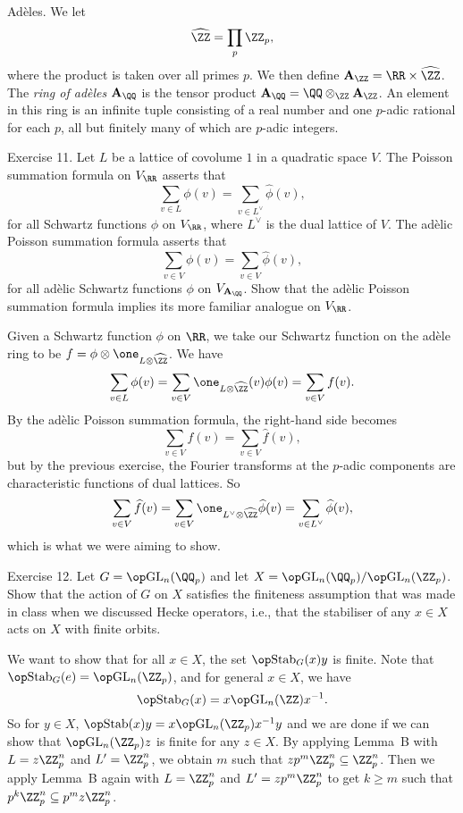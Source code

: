 \boldlabel Ad\`eles. We let
$$\hat\ZZ = \prod_p \ZZ_p,$$
\vskip-5pt\noindent
where the product is taken over all primes $p$.
We then define $\AA_\ZZ = \RR\times \hat\ZZ$. The {\it ring of ad\`eles} $\AA_\QQ$ is the tensor product
$\AA_\QQ = \QQ\otimes_\ZZ \AA_\ZZ$. An element in this ring is an infinite tuple consisting
of a real number and one $p$-adic
rational for each $p$, all but finitely many of which are $p$-adic integers.

\nineproclaim Exercise 11. Let $L$ be a lattice of covolume $1$ in a quadratic space $V$. The Poisson
summation formula on $V_\RR$ asserts that
$$\sum_{v\in L} \phi(v) = \sum_{v\in L^\vee} \hat\phi(v),$$
for all Schwartz functions $\phi$ on $V_\RR$, where $L^\vee$ is the dual lattice of $V$. The ad\`elic
Poisson summation formula asserts that
$$\sum_{v\in V} \phi(v) = \sum_{v\in V} \hat\phi(v),$$
for all ad\`elic Schwartz functions $\phi$ on $V_{\AA_\QQ}$. Show that the ad\`elic Poisson
summation formula implies its more familiar analogue on $V_\RR$.

\nineproof
Given a Schwartz function $\phi$ on $\RR$, we take our Schwartz function
on the ad\`ele ring to be $f = \phi \otimes \one_{L\otimes \hat\ZZ}$. We have
$$\sum_{v\in L} \phi(v) = \sum_{v\in V} \one_{L\otimes \hat\ZZ}(v) \phi(v) = \sum_{v\in V} f(v).$$
By the ad\`elic Poisson summation formula, the right-hand side becomes
$$\sum_{v\in V} f(v) = \sum_{v\in V} \hat f(v),$$
but by the previous exercise, the Fourier transforms at the $p$-adic components are characteristic functions
of dual lattices. So
$$\sum_{v\in V} \hat f(v) = \sum_{v\in V} \one_{L^\vee\otimes \hat\ZZ} \hat\phi(v) = \sum_{v\in L^\vee}
\hat\phi(v),$$
which is what we were aiming to show.
\slug

\nineproclaim Exercise 12. Let $G = \GL_n(\QQ_p)$ and let $X = \GL_n(\QQ_p)/\GL_n(\ZZ_p)$. Show that
the action of $G$ on $X$ satisfies the finiteness assumption that was made in class when we discussed
Hecke operators, i.e., that the stabiliser of any $x\in X$ acts on $X$ with finite orbits.

\nineproof We want to show that for all $x\in X$, the set
$\Stab_G(x) y$ is finite. Note that $\Stab_G(e) = \GL_n(\ZZ_p)$, and for general $x\in X$, we have
$$\Stab_G(x) = x \GL_n(\ZZ) x^{-1}.$$
So for $y\in X$, $\Stab(x) y = x\GL_n(\ZZ_p) x^{-1} y$ and we are done if we can show that
$\GL_n(\ZZ_p) z$ is finite for any $z\in X$.
By applying Lemma~B with $L = z\ZZ_p^n$ and $L' = \ZZ_p^n$, we obtain $m$ such that
$zp^m \ZZ_p^n \subseteq \ZZ_p^n$. Then we apply Lemma~B again with $L = \ZZ_p^n$ and $L' = zp^m \ZZ_p^n$
to get $k\ge m$ such that $p^{k}\ZZ_p^n\subseteq p^m z\ZZ_p^n$.

